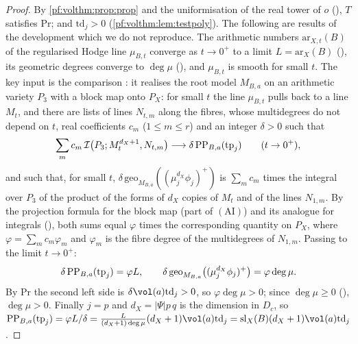 \begin{proof}
By \cref{pf:volthm:prop:prop} and the uniformisation of the real tower of $o$
(), $T$ satisfies $\mathrm{Pr}$; and $\mathrm{td}_j>0$
(\cref{pf:volthm:lem:testpoly}). The following are results of the development which we do not reproduce. The
arithmetic numbers $\mathrm{ar}_{X,t}(B)$ of the regularised Hodge line $\mu_{B,t}$ converge as $t\to0^+$ to a limit
$L=\mathrm{ar}_X(B)$ (), its geometric degrees converge to
$\deg\mu$ (), and $\mu_{B,t}$ is smooth for small $t$. The key
input is the comparison : it realises the root model $M_{B,a}$ on
an arithmetic variety $P_3$ with a block map onto $P_X$: for small $t$ the line $\mu_{B,t}$ pulls back to a line
$M_t$, and there are lists of lines $N_{t,m}$ along the fibres, whose multidegrees do not depend on $t$, real
coefficients $c_m$ ($1\le m\le r$) and an integer $\delta>0$ such that
\[
\sum_mc_m\,\mathcal{I}\bigl(P_3;M_t^{d_X+1},N_{t,m}\bigr)\longrightarrow\delta\,\mathrm{PP}_{B,a}(\mathrm{tp}_j)\qquad(t\to0^+),
\]
and such that, for small $t$, $\delta\,\mathrm{geo}_{M_{B,a}}((\mu_j^{d_X}\phi_j)^+)$ is $\sum_mc_m$ times the integral
over $P_3$ of the product of the forms of $d_X$ copies of $M_t$ and of the lines $N_{1,m}$. By the projection
formula for the block map (part of $(\mathrm{AI})$) and its analogue for integrals
(), both sums equal $\varphi$ times the corresponding
quantity on $P_X$, where $\varphi=\sum_mc_m\varphi_m$ and $\varphi_m$ is the fibre degree of the multidegrees of
$N_{1,m}$. Passing to the limit $t\to0^+$:
\[
\delta\,\mathrm{PP}_{B,a}(\mathrm{tp}_j)=\varphi L,\qquad
\delta\,\mathrm{geo}_{M_{B,a}}\bigl((\mu_j^{d_X}\phi_j)^+\bigr)=\varphi\deg\mu .
\]
By $\mathrm{Pr}$ the second left side is $\delta\vol(a)\mathrm{td}_j>0$, so $\varphi\deg\mu>0$; since
$\deg\mu\ge0$ (), $\deg\mu>0$. Finally $j=p$ and
$d_X=|\Psi|p\,q$ is the dimension in $D_c$, so
$\volthmPP_{B,a}(\mathrm{tp}_j)=\varphi L/\delta=\frac{L}{(d_X+1)\deg\mu}(d_X+1)\vol(a)\mathrm{td}_j=
\mathrm{sl}_X(B)(d_X+1)\vol(a)\mathrm{td}_j$.
\end{proof}

